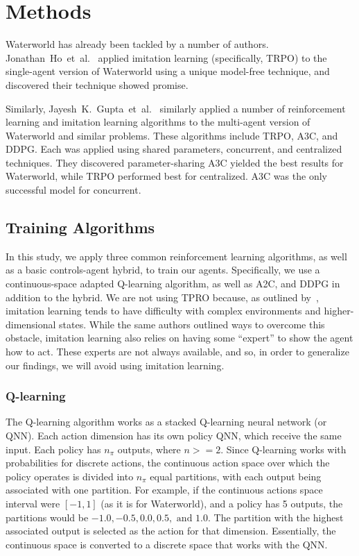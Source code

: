 \section{Methods}\label{sec:methods}
Waterworld has already been tackled by a number of authors.
Jonathan~Ho~et~al.~\cite{Ho2016} applied imitation learning (specifically, TRPO) to the
single-agent version of Waterworld using a unique model-free technique, and discovered
their technique showed promise.

Similarly, Jayesh~K.~Gupta~et~al.~\cite{Gupta2017} similarly applied a number of
reinforcement learning and imitation learning algorithms to the multi-agent version
of Waterworld and similar problems.
These algorithms include TRPO, A3C, and DDPG\@.
Each was applied using shared parameters, concurrent, and centralized techniques.
They discovered parameter-sharing A3C yielded the best results for Waterworld, while
TRPO performed best for centralized.
A3C was the only successful model for concurrent.

\subsection{Training Algorithms}\label{subsec:training-algorithms}
In this study, we apply three common reinforcement learning algorithms, as well as a
basic controls-agent hybrid, to train our agents.
Specifically, we use a continuous-space adapted Q-learning algorithm, as well as A2C,
and DDPG in addition to the hybrid.
We are not using TPRO because, as outlined by~\cite{Ho2016}, imitation learning tends
to have difficulty with complex environments and higher-dimensional states.
While the same authors outlined ways to overcome this obstacle, imitation learning
also relies on having some ``expert'' to show the agent how to act.
These experts are not always available, and so, in order to generalize our findings,
we will avoid using imitation learning.

\subsubsection{Q-learning}
The Q-learning algorithm works as a stacked Q-learning neural network (or QNN).
Each action dimension has its own policy QNN, which receive the same input.
Each policy has $n_\pi$ outputs, where $n >= 2$.
Since Q-learning works with probabilities for discrete actions, the continuous
action space over which the policy operates is divided into $n_\pi$ equal partitions,
with each output being associated with one partition.
For example, if the continuous actions space interval were $[-1, 1]$ (as it is for
Waterworld), and a policy has 5 outputs, the partitions would be $-1.0, -0.5, 0.0, 0.5,
\text{ and } 1.0$.
The partition with the highest associated output is selected as the action for that
dimension.
Essentially, the continuous space is converted to a discrete space that works with
the QNN\@.

